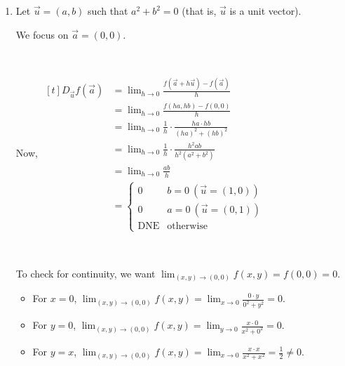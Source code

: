 \begin{enumerate}[label=\alph*)]
    \item Let $\vec{u} = (a,b)$ such that $a^2 + b^2 = 0$ (that is, $\vec{u}$ is a unit vector). 
    
    We focus on $\vec{a} = (0,0)$. 

    {~~~}

    Now, $\begin{aligned}[t]
        D_{\vec{u}} f(\vec{a}) & = \lim_{h\to0} \frac{f(\vec{a} + h\vec{u}) - f(\vec{a})}{h}          \\
                               & = \lim_{h\to0} \frac{f(ha,hb) - f(0,0)}{h}                           \\
                               & = \lim_{h\to0} \frac{1}{h} \cdot \frac{ha \cdot hb}{(ha)^2 + (hb)^2} \\
                               & = \lim_{h\to0} \frac{1}{h} \cdot \frac{h^2ab}{h^2(a^2 + b^2)}        \\
                               & = \lim_{h\to0} \frac{ab}{h}                                          \\
                               & = \begin{cases}
                                        0          & b = 0 ~ (\vec{u} = (1,0))\\
                                        0          & a = 0 ~ (\vec{u} = (0,1))\\
                                        \text{DNE} & \text{otherwise}
                                   \end{cases}
    \end{aligned}$

    {~~~}

    To check for continuity, we want $\lim_{(x,y)\to(0,0)} f(x,y) = f(0,0) = 0$. 

    \begin{itemize}
        \item For $x = 0$, $\lim_{(x,y)\to(0,0)} f(x,y) = \lim_{x\to0} \frac{0 \cdot y}{0^2 + y^2} = 0$.
        \item For $y = 0$, $\lim_{(x,y)\to(0,0)} f(x,y) = \lim_{y\to0} \frac{x \cdot 0}{x^2 + 0^2} = 0$.
        \item For $y = x$, $\lim_{(x,y)\to(0,0)} f(x,y) = \lim_{x\to0} \frac{x \cdot x}{x^2 + x^2} = \frac{1}{2} \neq 0$. 
    \end{itemize}

    {~~~}
    

\end{enumerate}
